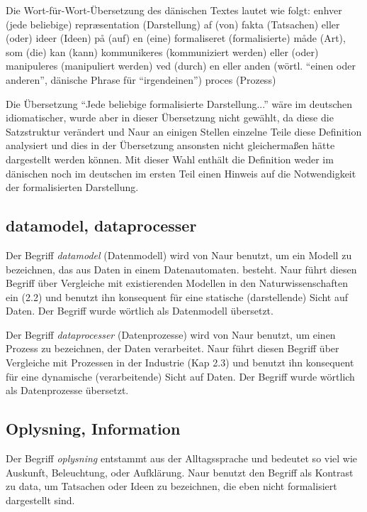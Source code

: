     Die Wort-für-Wort-Übersetzung des dänischen Textes lautet wie folgt: enhver (jede beliebige) repræsentation (Darstellung) af (von) fakta (Tatsachen) eller (oder) ideer (Ideen) på (auf) en (eine) formaliseret (formalisierte) måde (Art), som (die) kan (kann) kommunikeres (kommuniziert werden) eller (oder) manipuleres (manipuliert werden) ved (durch) en eller anden (wörtl. \enquote{einen oder anderen}, dänische Phrase für \enquote{irgendeinen}) proces (Prozess)
    
    Die Übersetzung \enquote{Jede beliebige formalisierte Darstellung...} wäre im deutschen idiomatischer, wurde aber in dieser Übersetzung nicht gewählt, da diese die Satzstruktur verändert und Naur an einigen Stellen einzelne Teile diese Definition analysiert und dies in der Übersetzung ansonsten nicht gleichermaßen hätte dargestellt werden können. Mit dieser Wahl enthält die Definition weder im dänischen noch im deutschen im ersten Teil einen Hinweis auf die Notwendigkeit der formalisierten Darstellung.

\subsection{datamodel, dataprocesser}

    Der Begriff \emph{datamodel} (Datenmodell) wird von Naur benutzt, um ein Modell zu bezeichnen, das aus Daten in einem Datenautomaten. besteht. Naur führt diesen Begriff über Vergleiche mit existierenden Modellen in den Naturwissenschaften ein (2.2) und benutzt ihn konsequent für eine statische (darstellende) Sicht auf Daten. Der Begriff wurde wörtlich als Datenmodell übersetzt.

    Der Begriff \emph{dataprocesser} (Datenprozesse) wird von Naur benutzt, um einen Prozess zu bezeichnen, der Daten verarbeitet. Naur führt diesen Begriff über Vergleiche mit Prozessen in der Industrie (Kap 2.3) und benutzt ihn konsequent für eine dynamische (verarbeitende) Sicht auf Daten. Der Begriff wurde wörtlich als Datenprozesse übersetzt. 

\subsection{Oplysning, Information}

    Der Begriff \emph{oplysning} entstammt aus der Alltagssprache und bedeutet so viel wie Auskunft, Beleuchtung, oder Aufklärung. Naur benutzt den Begriff als Kontrast zu data, um Tatsachen oder Ideen zu bezeichnen, die eben nicht formalisiert dargestellt sind.
    
